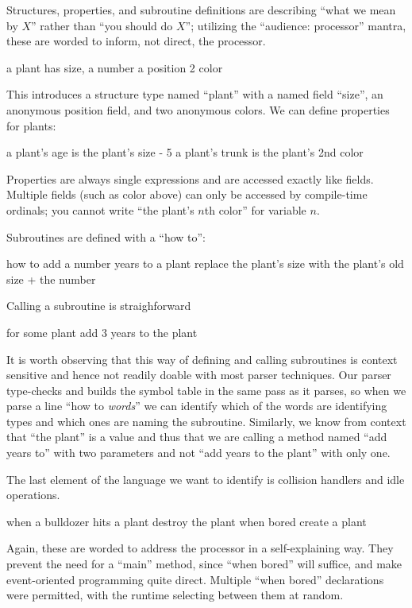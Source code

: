 \documentclass{sig-alternate}
\newcommand{\INDSTATE}[1][1]{\STATE\hspace{#1\algorithmicindent}}
\newenvironment{snippet}{\begin{algorithmic}[1]}{\end{algorithmic}}
\begin{document}
Structures, properties, and subroutine definitions
are describing ``what we mean by $X$''
rather than ``you should do $X$'';
utilizing the ``audience: processor'' mantra, these are worded 
to inform, not direct, the processor.
\begin{snippet}
\STATE a plant has
\INDSTATE size, a number
\INDSTATE a position
\INDSTATE 2 color
\end{snippet}
This introduces a structure type named ``plant''
with a named field ``size'', an anonymous position field, and two anonymous colors.
We can define properties for plants:
\begin{snippet}
\STATE a plant's age is the plant's size - 5
\STATE a plant's trunk is the plant's 2nd color
\end{snippet}
Properties are always single expressions and are accessed exactly like fields.
Multiple fields (such as color above) can only be accessed by compile-time ordinals;
you cannot write ``the plant's $n$th color'' for variable $n$.

Subroutines are defined with a ``how to'':
\begin{snippet}
\STATE how to add a number years to a plant
\INDSTATE replace the plant's size with the plant's old size + the number
\end{snippet}
Calling a subroutine is straighforward
\begin{snippet}
\STATE for some plant
\INDSTATE add 3 years to the plant
\end{snippet}
It is worth observing that this way of defining and calling subroutines
is context sensitive and hence not readily doable with most parser techniques.
Our parser type-checks and builds the symbol table in the same pass as it parses,
so when we parse a line ``how to \emph{words}''
we can identify which of the words are identifying types
and which ones are naming the subroutine.
Similarly, we know from context that ``the plant'' is a value
and thus that we are calling a method named ``add years to'' with two parameters
and not ``add years to the plant'' with only one.

The last element of the language we want to identify
is collision handlers and idle operations.
\begin{snippet}
\STATE when a bulldozer hits a plant
\INDSTATE destroy the plant
\STATE when bored
\INDSTATE create a plant
\end{snippet}
Again, these are worded to address the processor in a self-explaining way.
They prevent the need for a ``main'' method, since ``when bored'' will suffice,
and make event-oriented programming quite direct.
Multiple ``when bored'' declarations were permitted,
with the runtime selecting between them at random.
\end{document}
